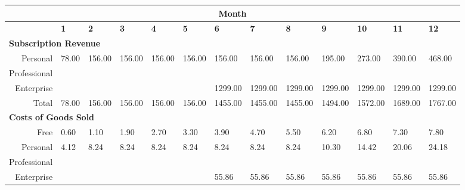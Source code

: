 \begin{sidewaystable}
\begin{table}[H]
  \setlength\tabcolsep{5pt}
  \def\arraystretch{1.2}%

  \begin{tabularx}{\textwidth}{X X X X X X X X X X X X X}

    \multicolumn{13}{c}{\textbf{Month}} \\

    \hline
    
    \multicolumn{1}{c}{} & \textbf{1} & \textbf{2} & \textbf{3} & \textbf{4} & \textbf{5} & \textbf{6} & \textbf{7} & \textbf{8} & \textbf{9} & \textbf{10} & \textbf{11} & \textbf{12}  \\

    \hline

    \multicolumn{13}{l}{\textbf{Subscription Revenue}} \\

    \hline

    \multicolumn{1}{r}{Personal} & 78.00 & 156.00 & 156.00 & 156.00  & 156.00  & 156.00  & 156.00  & 156.00  & 195.00  & 273.00  & 390.00  & 468.00  \\
    \multicolumn{1}{r}{Professional} &   &   &  &   &  &  &  &  &  &  &  &  \\
    \multicolumn{1}{r}{Enterprise} &  &  &  &  &  & 1299.00 & 1299.00 & 1299.00 & 1299.00 & 1299.00 & 1299.00 & 1299.00  \\

    \multicolumn{1}{r}{Total} & 78.00 & 156.00 & 156.00 & 156.00  & 156.00  & 1455.00  & 1455.00  & 1455.00  & 1494.00  & 1572.00  & 1689.00  & 1767.00  \\

    \hline

    \multicolumn{13}{l}{\textbf{Costs of Goods Sold}} \\

    \hline

    \multicolumn{1}{r}{Free} & 0.60 & 1.10  & 1.90 & 2.70 & 3.30 & 3.90 & 4.70 & 5.50 & 6.20 & 6.80 & 7.30 & 7.80  \\
    \multicolumn{1}{r}{Personal} & 4.12 & 8.24 & 8.24 & 8.24 & 8.24 & 8.24 & 8.24 & 8.24 & 10.30  & 14.42 & 20.06 & 24.18  \\
    \multicolumn{1}{r}{Professional} &  &  &  &  &  &  &  &  &  &  &  &   \\
    \multicolumn{1}{r}{Enterprise} &  &  &  &  &  & 55.86 & 55.86 & 55.86 & 55.86 & 55.86 & 55.86 & 55.86  \\


\end{tabularx}
\end{table}
\end{sidewaystable}
